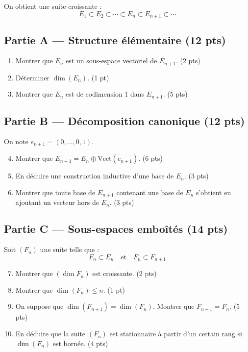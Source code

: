 \documentclass[11pt,a4paper]{article}
\begin{document}
On obtient une suite croissante :
\[
E_1 \subset E_2 \subset \cdots \subset E_n \subset E_{n+1} \subset \cdots
\]

\subsection*{Partie A — Structure élémentaire (12 pts)}

\begin{enumerate}
\item Montrer que $E_n$ est un sous-espace vectoriel de $E_{n+1}$. \hfill (2 pts)
\item Déterminer $\dim(E_n)$. \hfill (1 pt)
\item Montrer que $E_n$ est de codimension 1 dans $E_{n+1}$. \hfill (5 pts)
\end{enumerate}

\subsection*{Partie B — Décomposition canonique (12 pts)}

On note $e_{n+1} = (0,\dots,0,1)$.

\begin{enumerate}
\setcounter{enumi}{3}
\item Montrer que $E_{n+1} = E_n \oplus \mathrm{Vect}(e_{n+1})$. \hfill (6 pts)
\item En déduire une construction inductive d’une base de $E_n$. \hfill (3 pts)
\item Montrer que toute base de $E_{n+1}$ contenant une base de $E_n$ s’obtient en ajoutant un vecteur hors de $E_n$. \hfill (3 pts)
\end{enumerate}

\subsection*{Partie C — Sous-espaces emboîtés (14 pts)}

Soit $(F_n)$ une suite telle que :
\[
F_n \subset E_n \quad \text{et} \quad F_n \subset F_{n+1}
\]

\begin{enumerate}
\setcounter{enumi}{6}
\item Montrer que $(\dim F_n)$ est croissante. \hfill (2 pts)
\item Montrer que $\dim(F_n) \leq n$. \hfill (1 pt)
\item On suppose que $\dim(F_{n+1}) = \dim(F_n)$. Montrer que $F_{n+1} = F_n$. \hfill (5 pts)
\item En déduire que la suite $(F_n)$ est stationnaire à partir d’un certain rang si $\dim(F_n)$ est bornée. \hfill (4 pts)
\end{enumerate}
\end{document}
